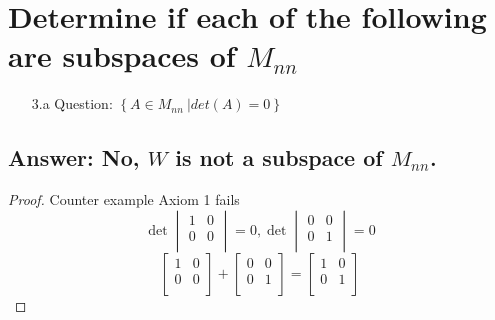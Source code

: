 \documentclass[11pt]{article}
\newcommand{\DS} [1] {${\displaystyle #1}$}
\begin{document}
\section{Determine if each of the following are subspaces of $M_{nn}$}
\begin{enumerate}
        \item [3.a]Question: \DS{ \left\{A\in{M_{nn}} \ | det (A) = 0 \right\}}
\end{enumerate}
\subsection{Answer: No, $W$ is not a subspace of $M_{nn}$.}
\begin{proof}
        Counter example Axiom 1 fails \\
        \begin{equation*}
                \det
                \begin{vmatrix}
                        {1} & {0} \\
                        {0} & {0} \\
                \end{vmatrix}
                {= 0},
                \det
                \begin{vmatrix}
                        {0} & {0} \\
                        {0} & {1} \\
                \end{vmatrix}
                = 0
        \end{equation*}
        \begin{equation*}
                \begin{bmatrix}
                        {1} & {0} \\
                        {0} & {0} \\
                \end{bmatrix}
                +
                \begin{bmatrix}
                        {0} & {0} \\
                        {0} & {1} \\
                \end{bmatrix}
                =
                \begin{bmatrix}
                        {1} & {0} \\
                        {0} & {1} \\
                \end{bmatrix}

\end{equation*}
\end{proof}
\end{document}
